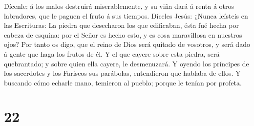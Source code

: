  Dícenle: á los malos destruirá miserablemente, y su viña
dará á renta á otros labradores, que le paguen el fruto á sus tiempos.
 Díceles Jesús: ¿Nunca leísteis en las Escrituras: La
piedra que desecharon los que edificaban, ésta fué hecha por cabeza de
esquina: por el Señor es hecho esto, y es cosa maravillosa en nuestros
ojos?  Por tanto os digo, que el reino de Dios será
quitado de vosotros, y será dado á gente que haga los frutos de él.
 Y el que cayere sobre esta piedra, será quebrantado; y
sobre quien ella cayere, le desmenuzará.  Y oyendo los
príncipes de los sacerdotes y los Fariseos sus parábolas, entendieron
que hablaba de ellos.  Y buscando cómo echarle mano,
temieron al pueblo; porque le tenían por profeta.

\hypertarget{section-21}{%
\section{22}\label{section-21}}

